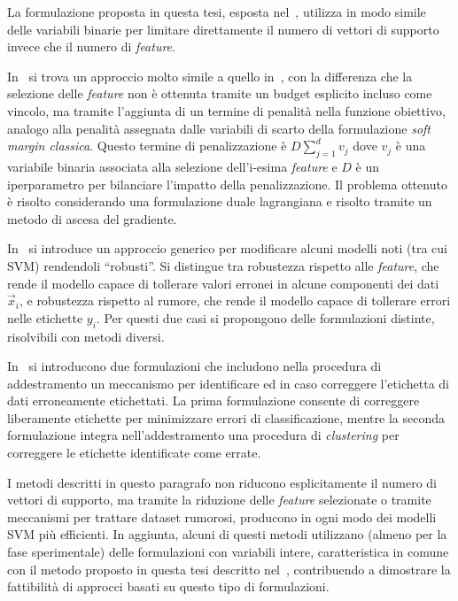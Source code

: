 La formulazione proposta in questa tesi, esposta nel~, utilizza in modo simile delle variabili binarie per limitare direttamente il numero di vettori di supporto invece che il numero di \emph{feature}.

In~\cite{2017_lagrangian_feature_selection} si trova un approccio molto simile a quello in~\cite{2014_MIP_feature_selection}, con la differenza che la selezione delle \emph{feature} non è ottenuta tramite un budget esplicito incluso come vincolo, ma tramite l'aggiunta di un termine di penalità nella funzione obiettivo, analogo alla penalità assegnata dalle variabili di scarto della formulazione \emph{soft margin classica}.
Questo termine di penalizzazione è $ D\sum_{j=1}^{d}v_j$ dove $v_j$ è una variabile binaria associata alla selezione dell'i-esima \emph{feature} e $D$ è un iperparametro per bilanciare l'impatto della penalizzazione. 
Il problema ottenuto è risolto considerando una formulazione duale lagrangiana e risolto tramite un metodo di ascesa del gradiente. 

In~\cite{2019_robust_classification} si introduce un approccio generico per modificare alcuni modelli noti (tra cui SVM) rendendoli ``robusti''.
Si distingue tra robustezza rispetto alle \emph{feature}, che rende il modello capace di tollerare valori erronei in alcune componenti dei dati $\Vec{x}_i$, e robustezza rispetto al rumore, che rende il modello capace di tollerare errori nelle etichette $y_i$.
Per questi due casi si propongono delle formulazioni distinte, risolvibili con metodi diversi.

In~\cite{2022_MILP_noise_relabeling} si introducono due formulazioni che includono nella procedura di addestramento un meccanismo per identificare ed in caso correggere l'etichetta di dati erroneamente etichettati.
La prima formulazione consente di correggere liberamente etichette per minimizzare errori di classificazione, mentre la seconda formulazione integra nell'addestramento una procedura di \emph{clustering} per correggere le etichette identificate come errate.

I metodi descritti in questo paragrafo non riducono esplicitamente il numero di vettori di supporto, ma tramite la riduzione delle \emph{feature} selezionate o tramite meccanismi per trattare dataset rumorosi, producono in ogni modo dei modelli SVM più efficienti.
In aggiunta, alcuni di questi metodi utilizzano (almeno per la fase sperimentale) delle formulazioni con variabili intere, caratteristica in comune con il metodo proposto in questa tesi descritto nel~, contribuendo a dimostrare la fattibilità di approcci basati su questo tipo di formulazioni.

